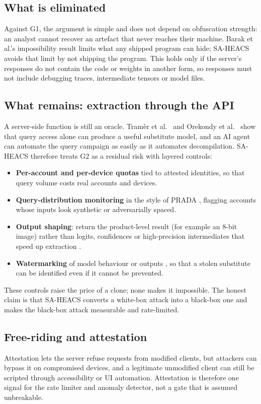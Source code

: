 \subsection{What is eliminated}
Against G1, the argument is simple and does not depend on obfuscation strength: an analyst
cannot recover an artefact that never reaches their machine. Barak et al.'s impossibility
result \cite{barak2012impossibility} limits what any shipped program can hide; SA-HEACS
avoids that limit by not shipping the program. This holds only if the server's responses do
not contain the code or weights in another form, so responses must not include debugging
traces, intermediate tensors or model files.

\subsection{What remains: extraction through the API}
A server-side function is still an oracle. Tramèr et al.\ \cite{tramer2016stealing} and
Orekondy et al.\ \cite{orekondy2019knockoff} show that query access alone can produce a
useful substitute model, and an AI agent can automate the query campaign as easily as it
automates decompilation. SA-HEACS therefore treats G2 as a residual risk with layered
controls:
\begin{itemize}
  \item \textbf{Per-account and per-device quotas} tied to attested identities, so that
        query volume costs real accounts and devices.
  \item \textbf{Query-distribution monitoring} in the style of PRADA \cite{juuti2019prada},
        flagging accounts whose inputs look synthetic or adversarially spaced.
  \item \textbf{Output shaping}: return the product-level result (for example an 8-bit
        image) rather than logits, confidences or high-precision intermediates that speed up
        extraction \cite{tramer2016stealing}.
  \item \textbf{Watermarking} of model behaviour or outputs \cite{adi2018watermarking}, so
        that a stolen substitute can be identified even if it cannot be prevented.
\end{itemize}
These controls raise the price of a clone; none makes it impossible. The honest claim is
that SA-HEACS converts a white-box attack into a black-box one and makes the black-box attack
measurable and rate-limited.

\subsection{Free-riding and attestation}
Attestation \cite{rfc9334,google_playintegrity,apple_appattest} lets the server refuse
requests from modified clients, but attackers can bypass it on compromised devices, and a
legitimate unmodified client can still be scripted through accessibility or UI automation.
Attestation is therefore one signal for the rate limiter and anomaly detector, not a gate
that is assumed unbreakable.

